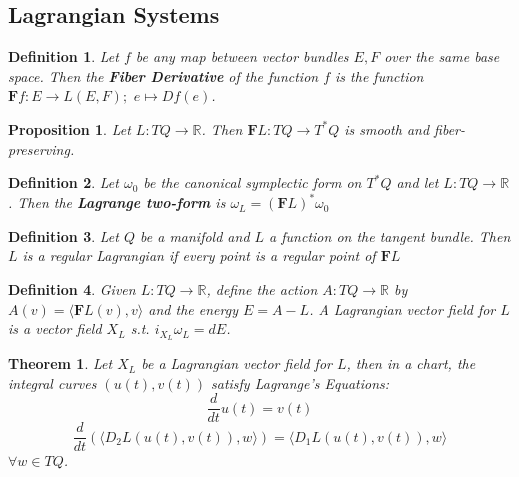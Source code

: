 \documentclass{article}
\newtheorem{thm}{Theorem}
\newtheorem{defn}{Definition}
\newtheorem{prop}{Proposition}
\begin{document}
\subsection{Lagrangian Systems}

\begin{defn}

Let $f$ be any map between vector bundles $E,F$ over the same base space. Then the \textbf{Fiber Derivative} of the function $f$ is the function $\textbf{F}f:E \to L(E,F); \hspace{4pt} e \mapsto Df(e)$.

\end{defn}

\begin{prop}

Let $L: TQ \to \mathbb{R}$. Then $\textbf{F}L:TQ \to T^*Q$ is smooth and fiber-preserving.

\end{prop}

\begin{defn}

Let $\omega_0$ be the canonical symplectic form on $T^*Q$ and let $L: TQ \to \mathbb{R}$. Then the \textbf{Lagrange two-form} is $\omega_L = (\textbf{F}L)^* \omega_0$

\end{defn}

\begin{defn}

Let $Q$ be a manifold and $L$ a function on the tangent bundle. Then $L$ is a regular Lagrangian if every point is a regular point of $\textbf{F}L$

\end{defn}

\begin{defn}

Given $L:TQ \to \mathbb{R}$, define the action $A: TQ \to \mathbb{R}$ by $A(v) = \langle \textbf{F}L(v), v\rangle $ and the energy $E = A - L$. A Lagrangian vector field for $L$ is a vector field $X_L$ s.t. $i_{X_L} \omega_L = dE$.

\end{defn}

\begin{thm}

Let $X_L$ be a  Lagrangian vector field for $L$, then in a chart, the integral curves $(u(t), v(t))$ satisfy Lagrange's Equations:
\[\frac{d}{dt}u(t) = v(t)\]
\[\frac{d}{dt}\left( \langle D_2 L(u(t),v(t)), w\rangle  \right) = \langle D_1 L(u(t),v(t)),w\rangle \]
$\forall w \in TQ$.

\end{thm}
\end{document}
